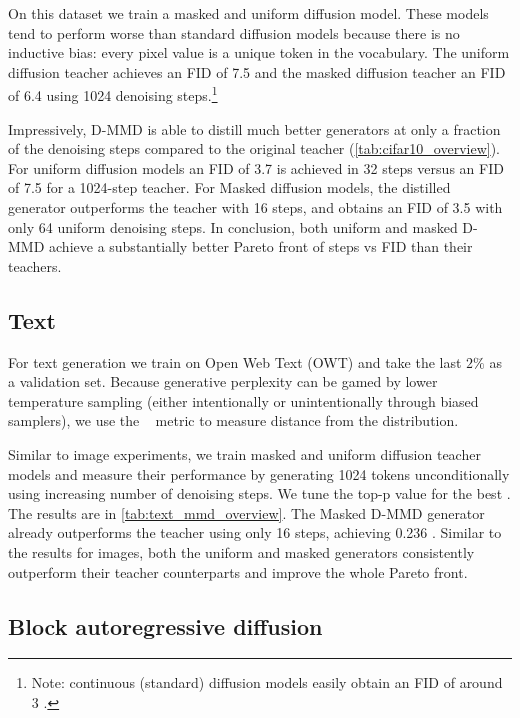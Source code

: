 On this dataset we train a masked and uniform diffusion model. These models tend to perform worse than standard diffusion models because there is no inductive bias: every pixel value is a unique token in the vocabulary.
The uniform diffusion teacher achieves an FID of 7.5 and the masked diffusion teacher an FID of 6.4 using 1024 denoising steps.\footnote{Note: continuous (standard) diffusion models easily obtain an FID of around 3 \citep{ho2020denoising}.}


Impressively, D-MMD is able to distill much better generators at only a fraction of the denoising steps compared to the original teacher (\autoref{tab:cifar10_overview}).
For uniform diffusion models an FID of 3.7 is achieved in 32 steps versus an FID of 7.5 for a 1024-step teacher. For Masked diffusion models, the distilled generator outperforms the teacher with 16 steps, and obtains an FID of 3.5 with only 64 uniform denoising steps.
In conclusion, both uniform and masked D-MMD achieve a substantially better Pareto front of steps vs FID than their teachers.



\subsection{Text}


For text generation we train on Open Web Text (OWT) and take the last $2\%$ as a validation set. Because generative perplexity can be gamed by lower temperature sampling (either intentionally or unintentionally through biased samplers), we use the \gge~ metric to measure distance from the distribution.

Similar to image experiments, we train masked and uniform diffusion teacher models and measure their performance by generating 1024 tokens unconditionally using increasing number of denoising steps. We tune the top-p value for the best \gge. The results are in \autoref{tab:text_mmd_overview}.
The Masked D-MMD generator already outperforms the teacher using only 16 steps, achieving 0.236 \gge.
Similar to the results for images, both the uniform and masked generators consistently outperform their teacher counterparts and improve the whole Pareto front.

\subsection{Block autoregressive diffusion}




